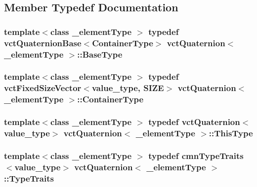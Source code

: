 \subsection{Member Typedef Documentation}
\hypertarget{classvct_quaternion_a6904ddafc9719f3ba49ffd08dc0b0702}{}
\subsubsection[{Base\+Type}]{\setlength{\rightskip}{0pt plus 5cm}template$<$class \+\_\+element\+Type $>$ typedef {\bf vct\+Quaternion\+Base}$<${\bf Container\+Type}$>$ {\bf vct\+Quaternion}$<$ \+\_\+element\+Type $>$\+::{\bf Base\+Type}}\label{classvct_quaternion_a6904ddafc9719f3ba49ffd08dc0b0702}
\hypertarget{classvct_quaternion_ac536cb4b97d3759e26fd33094a3630fa}{}
\subsubsection[{Container\+Type}]{\setlength{\rightskip}{0pt plus 5cm}template$<$class \+\_\+element\+Type $>$ typedef {\bf vct\+Fixed\+Size\+Vector}$<$value\+\_\+type, {\bf S\+I\+Z\+E}$>$ {\bf vct\+Quaternion}$<$ \+\_\+element\+Type $>$\+::{\bf Container\+Type}}\label{classvct_quaternion_ac536cb4b97d3759e26fd33094a3630fa}
\hypertarget{classvct_quaternion_a07e736b9769c53c9261fd2f4c79bf4c1}{}
\subsubsection[{This\+Type}]{\setlength{\rightskip}{0pt plus 5cm}template$<$class \+\_\+element\+Type $>$ typedef {\bf vct\+Quaternion}$<$value\+\_\+type$>$ {\bf vct\+Quaternion}$<$ \+\_\+element\+Type $>$\+::{\bf This\+Type}}\label{classvct_quaternion_a07e736b9769c53c9261fd2f4c79bf4c1}
\hypertarget{classvct_quaternion_a7a67c4eef1358c2853db271c468a1c03}{}
\subsubsection[{Type\+Traits}]{\setlength{\rightskip}{0pt plus 5cm}template$<$class \+\_\+element\+Type $>$ typedef {\bf cmn\+Type\+Traits}$<$value\+\_\+type$>$ {\bf vct\+Quaternion}$<$ \+\_\+element\+Type $>$\+::{\bf Type\+Traits}}\label{classvct_quaternion_a7a67c4eef1358c2853db271c468a1c03}



